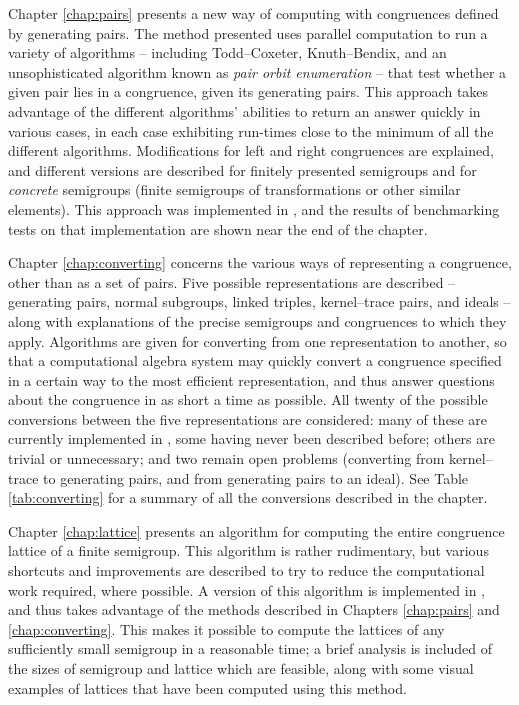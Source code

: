 Chapter \ref{chap:pairs} presents a new way of computing with congruences
defined by generating pairs.  The method presented uses parallel computation to
run a variety of algorithms -- including Todd--Coxeter, Knuth--Bendix, and an
unsophisticated algorithm known as \textit{pair orbit enumeration} -- that test
whether a given pair lies in a congruence, given its generating pairs.  This
approach takes advantage of the different algorithms' abilities to return an
answer quickly in various cases, in each case exhibiting run-times close to the
minimum of all the different algorithms.  Modifications for left and right
congruences are explained, and different versions are described for finitely
presented semigroups and for \textit{concrete} semigroups (finite semigroups of
transformations or other similar elements).  This approach was implemented in
\libsemigroups{} \cite{libsemigroups}, and the results of benchmarking tests on
that implementation are shown near the end of the chapter.

Chapter \ref{chap:converting} concerns the various ways of representing a
congruence, other than as a set of pairs.  Five possible representations are
described -- generating pairs, normal subgroups, linked triples, kernel--trace
pairs, and ideals -- along with explanations of the precise semigroups and
congruences to which they apply.  Algorithms are given for converting from one
representation to another, so that a computational algebra system may quickly
convert a congruence specified in a certain way to the most efficient
representation, and thus answer questions about the congruence in as short a
time as possible.  All twenty of the possible conversions between the five
representations are considered: many of these are currently implemented in
\Semigroups{} \cite{semigroups}, some having never been described before; others
are trivial or unnecessary; and two remain open problems (converting from
kernel--trace to generating pairs, and from generating pairs to an ideal).  See
Table \ref{tab:converting} for a summary of all the conversions described in the
chapter.

Chapter \ref{chap:lattice} presents an algorithm for computing the entire
congruence lattice of a finite semigroup.  This algorithm is rather rudimentary,
but various shortcuts and improvements are described to try to reduce the
computational work required, where possible.  A version of this algorithm is
implemented in \Semigroups{}, and thus takes advantage of the methods described
in Chapters \ref{chap:pairs} and \ref{chap:converting}.  This makes it possible
to compute the lattices of any sufficiently small semigroup in a reasonable
time; a brief analysis is included of the sizes of semigroup and lattice which
are feasible, along with some visual examples of lattices that have been
computed using this method.

